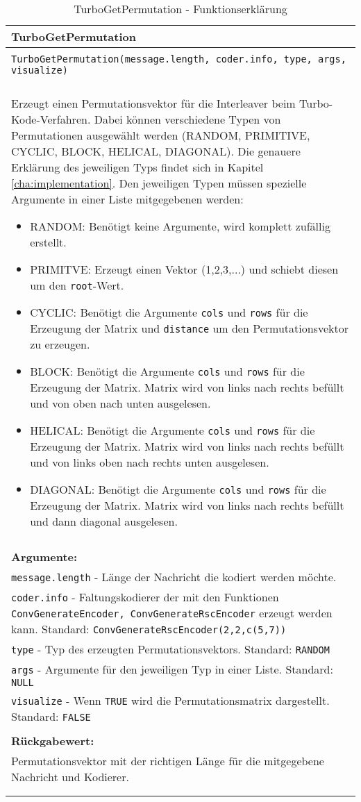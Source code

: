 \begin{longtable}{|p{\textwidth}|}
\hline
\rowcolor{lightblue}TurboGetPermutation\\
\hline
\\
\texttt{TurboGetPermutation(message.length, coder.info, type, args, visualize)}\\
\\
Erzeugt einen Permutationsvektor für die Interleaver beim Turbo-Kode-Verfahren. Dabei können verschiedene Typen von Permutationen ausgewählt werden (RANDOM, PRIMITIVE, CYCLIC, BLOCK, HELICAL, DIAGONAL). Die genauere Erklärung des jeweiligen Typs findet sich in Kapitel \ref{cha:implementation}. Den jeweiligen Typen müssen spezielle Argumente in einer Liste mitgegebenen werden:
\begin{itemize}
\item RANDOM: Benötigt keine Argumente, wird komplett zufällig erstellt.
\item PRIMITVE: Erzeugt einen Vektor (1,2,3,...) und schiebt diesen um den \texttt{root}-Wert.
\item CYCLIC: Benötigt die Argumente \texttt{cols} und \texttt{rows} für die Erzeugung der Matrix und \texttt{distance} um den Permutationsvektor zu erzeugen.
\item BLOCK: Benötigt die Argumente \texttt{cols} und \texttt{rows} für die Erzeugung der Matrix. Matrix wird von links nach rechts befüllt und von oben nach unten ausgelesen.
\item HELICAL: Benötigt die Argumente \texttt{cols} und \texttt{rows} für die Erzeugung der Matrix. Matrix wird von links nach rechts befüllt und von links oben nach rechts unten ausgelesen.
\item DIAGONAL: Benötigt die Argumente \texttt{cols} und \texttt{rows} für die Erzeugung der Matrix. Matrix wird von links nach rechts befüllt und dann diagonal ausgelesen.
\end{itemize} \\
\\
\textbf{Argumente:}\\
\texttt{message.length} - Länge der Nachricht die kodiert werden möchte.\\
\texttt{coder.info} - Faltungskodierer der mit den Funktionen \texttt{ConvGenerateEncoder, ConvGenerateRscEncoder} erzeugt werden kann. Standard: \texttt{ConvGenerateRscEncoder(2,2,c(5,7))}\\
\texttt{type} - Typ des erzeugten Permutationsvektors. Standard: \texttt{RANDOM}\\
\texttt{args} - Argumente für den jeweiligen Typ in einer Liste. Standard: \texttt{NULL}\\
\texttt{visualize} - Wenn \texttt{TRUE} wird die Permutationsmatrix dargestellt. Standard: \texttt{FALSE}\\
\\
\textbf{Rückgabewert:}\\
Permutationsvektor mit der richtigen Länge für die mitgegebene Nachricht und Kodierer.\\
\\
\hline
\caption[TurboGetPermutation]{TurboGetPermutation - Funktionserklärung}
\end{longtable}